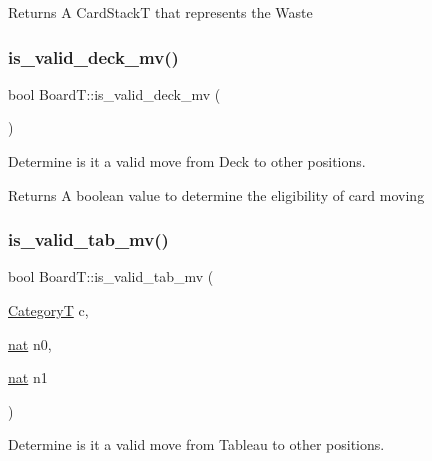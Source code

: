 \begin{DoxyReturn}{Returns}
A Card\+StackT that represents the Waste 
\end{DoxyReturn}
\mbox{\label{class_board_t_affe6cfc5c246bcfa0afd59476c70db8c}} 
\subsubsection{\texorpdfstring{is\+\_\+valid\+\_\+deck\+\_\+mv()}{is\_valid\_deck\_mv()}}
{\footnotesize\ttfamily bool Board\+T\+::is\+\_\+valid\+\_\+deck\+\_\+mv (\begin{DoxyParamCaption}{ }\end{DoxyParamCaption})}



Determine is it a valid move from Deck to other positions. 

\begin{DoxyReturn}{Returns}
A boolean value to determine the eligibility of card moving 
\end{DoxyReturn}
\mbox{\label{class_board_t_aeeb18d1b2d9889a9a560777794f58b50}} 
\subsubsection{\texorpdfstring{is\+\_\+valid\+\_\+tab\+\_\+mv()}{is\_valid\_tab\_mv()}}
{\footnotesize\ttfamily bool Board\+T\+::is\+\_\+valid\+\_\+tab\+\_\+mv (\begin{DoxyParamCaption}\item[{\hyperlink{_card_types_8h_aa77f81f8d4c8aa57046a50ca32d6b7b4}{CategoryT}}]{c,  }\item[{\hyperlink{_card_types_8h_a56638ee9d162e8cce3a15f92d2023d6e}{nat}}]{n0,  }\item[{\hyperlink{_card_types_8h_a56638ee9d162e8cce3a15f92d2023d6e}{nat}}]{n1 }\end{DoxyParamCaption})}



Determine is it a valid move from Tableau to other positions. 


